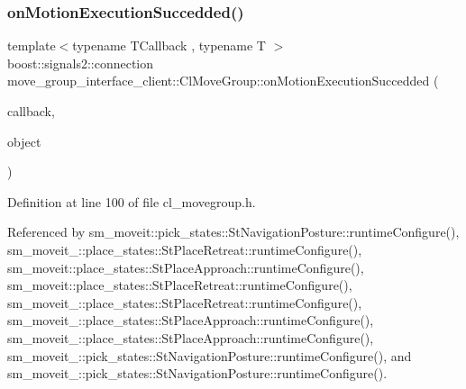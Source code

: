 \subsubsection{\texorpdfstring{on\+Motion\+Execution\+Succedded()}{onMotionExecutionSuccedded()}}
{\footnotesize\ttfamily template$<$typename T\+Callback , typename T $>$ \\
boost\+::signals2\+::connection move\+\_\+group\+\_\+interface\+\_\+client\+::\+Cl\+Move\+Group\+::on\+Motion\+Execution\+Succedded (\begin{DoxyParamCaption}\item[{T\+Callback}]{callback,  }\item[{T $\ast$}]{object }\end{DoxyParamCaption})\hspace{0.3cm}{\ttfamily [inline]}}



Definition at line 100 of file cl\+\_\+movegroup.\+h.



Referenced by sm\+\_\+moveit\+::pick\+\_\+states\+::\+St\+Navigation\+Posture\+::runtime\+Configure(), sm\+\_\+moveit\+\_\+::place\+\_\+states\+::\+St\+Place\+Retreat\+::runtime\+Configure(), sm\+\_\+moveit\+::place\+\_\+states\+::\+St\+Place\+Approach\+::runtime\+Configure(), sm\+\_\+moveit\+::place\+\_\+states\+::\+St\+Place\+Retreat\+::runtime\+Configure(), sm\+\_\+moveit\+\_\+::place\+\_\+states\+::\+St\+Place\+Retreat\+::runtime\+Configure(), sm\+\_\+moveit\+\_\+::place\+\_\+states\+::\+St\+Place\+Approach\+::runtime\+Configure(), sm\+\_\+moveit\+\_\+::place\+\_\+states\+::\+St\+Place\+Approach\+::runtime\+Configure(), sm\+\_\+moveit\+\_\+::pick\+\_\+states\+::\+St\+Navigation\+Posture\+::runtime\+Configure(), and sm\+\_\+moveit\+\_\+::pick\+\_\+states\+::\+St\+Navigation\+Posture\+::runtime\+Configure().


